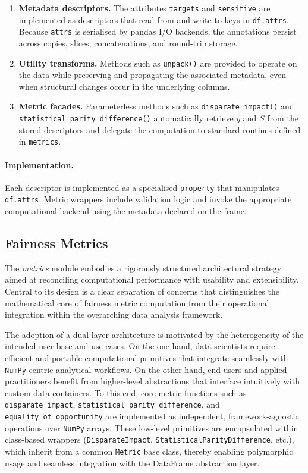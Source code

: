 \documentclass[12pt,a4paper,openright,twoside]{book}
\begin{document}
\begin{enumerate}[label=\alph*)]
  \item \textbf{Metadata descriptors.} The attributes \texttt{targets} and \texttt{sensitive} are implemented as descriptors that read from and write to keys in \texttt{df.attrs}. Because \texttt{attrs} is serialised by pandas I/O backends, the annotations persist across copies, slices, concatenations, and round-trip storage.
  \item \textbf{Utility transforms.} Methods such as \texttt{unpack()} are provided to operate on the data while preserving and propagating the associated metadata, even when structural changes occur in the underlying columns.
  \item \textbf{Metric facades.} Parameterless methods such as \texttt{disparate\_impact()} and \texttt{statistical\_parity\_difference()} automatically retrieve $y$ and $S$ from the stored descriptors and delegate the computation to standard routines defined in \texttt{metrics}.
\end{enumerate}

\paragraph{Implementation.} Each descriptor is implemented as a specialised \texttt{property} that manipulates \texttt{df.attrs}. Metric wrappers include validation logic and invoke the appropriate computational backend using the metadata declared on the frame.

\subsection*{Fairness Metrics}

The \textit{metrics} module embodies a rigorously structured architectural strategy aimed at reconciling computational performance with usability and extensibility. Central to its design is a clear separation of concerns that distinguishes the mathematical core of fairness metric computation from their operational integration within the overarching data analysis framework.

The adoption of a dual-layer architecture is motivated by the heterogeneity of the intended user base and use cases. On the one hand, data scientists require efficient and portable computational primitives that integrate seamlessly with \texttt{NumPy}-centric analytical workflows. On the other hand, end-users and applied practitioners benefit from higher-level abstractions that interface intuitively with custom data containers. To this end, core metric functions such as \texttt{disparate\_impact}, \texttt{statistical\_parity\_difference}, and \texttt{equality\_of\_opportunity} are implemented as independent, framework-agnostic operations over \texttt{NumPy} arrays. These low-level primitives are encapsulated within class-based wrappers (\texttt{DisparateImpact}, \texttt{StatisticalParityDifference}, etc.), which inherit from a common \texttt{Metric} base class, thereby enabling polymorphic usage and seamless integration with the DataFrame abstraction layer.
\end{document}
